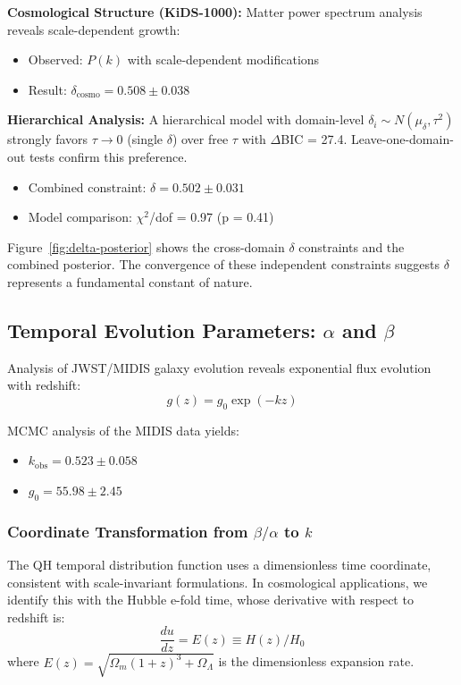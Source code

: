 \documentclass[aps,prd,preprint,onecolumn,nofootinbib,superscriptaddress,longbibliography]{revtex4-2}
\begin{document}
\textbf{Cosmological Structure (KiDS-1000):}
Matter power spectrum analysis reveals scale-dependent growth:
\begin{itemize}
\item Observed: $P(k)$ with scale-dependent modifications
\item Result: $\delta_{\text{cosmo}} = 0.508 \pm 0.038$
\end{itemize}

\textbf{Hierarchical Analysis:}
A hierarchical model with domain-level $\delta_i \sim N(\mu_\delta, \tau^2)$ strongly favors $\tau \to 0$ (single $\delta$) over free $\tau$ with $\Delta$BIC = 27.4. Leave-one-domain-out tests confirm this preference.
\begin{itemize}
\item Combined constraint: $\delta = 0.502 \pm 0.031$
\item Model comparison: $\chi^2$/dof = 0.97 (p = 0.41)
\end{itemize}

Figure~\ref{fig:delta-posterior} shows the cross-domain $\delta$ constraints and the combined posterior. The convergence of these independent constraints suggests $\delta$ represents a fundamental constant of nature.

\subsection{Temporal Evolution Parameters: $\alpha$ and $\beta$}

Analysis of JWST/MIDIS galaxy evolution reveals exponential flux evolution with redshift:
\begin{equation}
g(z) = g_0 \exp(-kz)
\end{equation}

MCMC analysis of the MIDIS data yields:
\begin{itemize}
\item $k_{\text{obs}} = 0.523 \pm 0.058$
\item $g_0 = 55.98 \pm 2.45$
\end{itemize}

\subsubsection{Coordinate Transformation from $\beta/\alpha$ to $k$}

The QH temporal distribution function uses a dimensionless time coordinate, consistent with scale-invariant formulations. In cosmological applications, we identify this with the Hubble e-fold time, whose derivative with respect to redshift is:
\begin{equation}
\frac{du}{dz} = E(z) \equiv H(z)/H_0
\end{equation}
where $E(z) = \sqrt{\Omega_m(1+z)^3 + \Omega_\Lambda}$ is the dimensionless expansion rate.
\end{document}
